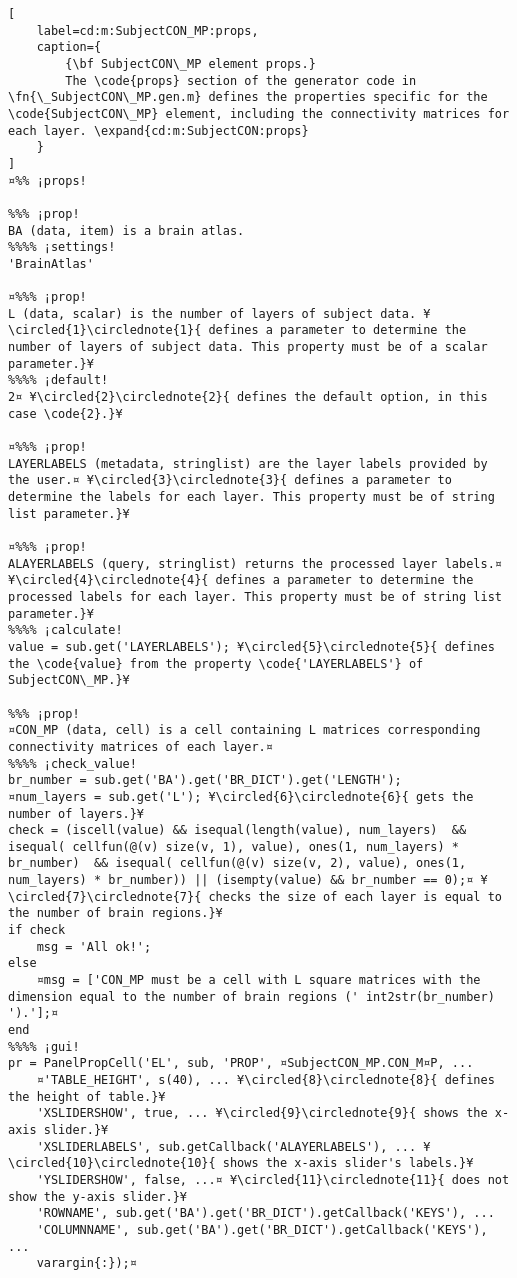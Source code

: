 \documentclass{tufte-handout}
\begin{document}
\begin{lstlisting}[
	label=cd:m:SubjectCON_MP:props,
	caption={
		{\bf SubjectCON\_MP element props.}
		The \code{props} section of the generator code in \fn{\_SubjectCON\_MP.gen.m} defines the properties specific for the \code{SubjectCON\_MP} element, including the connectivity matrices for each layer. \expand{cd:m:SubjectCON:props}
	}
]
¤%% ¡props!

%%% ¡prop!
BA (data, item) is a brain atlas.
%%%% ¡settings!
'BrainAtlas'

¤%%% ¡prop! 
L (data, scalar) is the number of layers of subject data. ¥\circled{1}\circlednote{1}{ defines a parameter to determine the number of layers of subject data. This property must be of a scalar parameter.}¥
%%%% ¡default!
2¤ ¥\circled{2}\circlednote{2}{ defines the default option, in this case \code{2}.}¥

¤%%% ¡prop! 
LAYERLABELS (metadata, stringlist) are the layer labels provided by the user.¤ ¥\circled{3}\circlednote{3}{ defines a parameter to determine the labels for each layer. This property must be of string list parameter.}¥

¤%%% ¡prop!
ALAYERLABELS (query, stringlist) returns the processed layer labels.¤ ¥\circled{4}\circlednote{4}{ defines a parameter to determine the processed labels for each layer. This property must be of string list parameter.}¥
%%%% ¡calculate!
value = sub.get('LAYERLABELS'); ¥\circled{5}\circlednote{5}{ defines the \code{value} from the property \code{'LAYERLABELS'} of SubjectCON\_MP.}¥

%%% ¡prop!
¤CON_MP (data, cell) is a cell containing L matrices corresponding connectivity matrices of each layer.¤
%%%% ¡check_value!
br_number = sub.get('BA').get('BR_DICT').get('LENGTH');
¤num_layers = sub.get('L'); ¥\circled{6}\circlednote{6}{ gets the number of layers.}¥
check = (iscell(value) && isequal(length(value), num_layers)  && isequal( cellfun(@(v) size(v, 1), value), ones(1, num_layers) * br_number)  && isequal( cellfun(@(v) size(v, 2), value), ones(1, num_layers) * br_number)) || (isempty(value) && br_number == 0);¤ ¥\circled{7}\circlednote{7}{ checks the size of each layer is equal to the number of brain regions.}¥
if check
    msg = 'All ok!';
else   
    ¤msg = ['CON_MP must be a cell with L square matrices with the dimension equal to the number of brain regions (' int2str(br_number) ').'];¤
end
%%%% ¡gui! 
pr = PanelPropCell('EL', sub, 'PROP', ¤SubjectCON_MP.CON_M¤P, ...
    ¤'TABLE_HEIGHT', s(40), ... ¥\circled{8}\circlednote{8}{ defines the height of table.}¥
    'XSLIDERSHOW', true, ... ¥\circled{9}\circlednote{9}{ shows the x-axis slider.}¥
    'XSLIDERLABELS', sub.getCallback('ALAYERLABELS'), ... ¥\circled{10}\circlednote{10}{ shows the x-axis slider's labels.}¥
    'YSLIDERSHOW', false, ...¤ ¥\circled{11}\circlednote{11}{ does not show the y-axis slider.}¥
    'ROWNAME', sub.get('BA').get('BR_DICT').getCallback('KEYS'), ...
    'COLUMNNAME', sub.get('BA').get('BR_DICT').getCallback('KEYS'), ...
    varargin{:});¤

\end{lstlisting}
\end{document}
